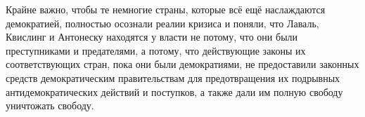 Крайне важно, чтобы те немногие страны, которые всё ещё наслаждаются демократией, полностью осознали реалии кризиса и поняли, что Лаваль, Квислинг и Антонеску находятся у власти не потому, что они были преступниками и предателями, а потому, что действующие законы их соответствующих стран, пока они были демократиями, не предоставили законных средств демократическим правительствам для предотвращения их подрывных антидемократических действий и поступков, а также дали им полную свободу уничтожать свободу.
